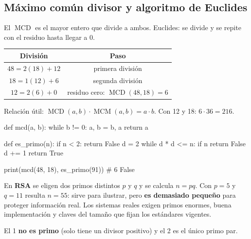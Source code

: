 \subsection{M\'aximo com\'un divisor y algoritmo de Euclides}
El $\operatorname{MCD}$ es el mayor entero que divide a ambos. Euclides: se divide y se repite con el residuo hasta llegar a 0.

\begin{center}
\begin{tabular}{|c|c|}
\hline
\rowcolor{tmAzulClaro}\textbf{Divisi\'on} & \textbf{Paso}\\ \hline
$48=2(18)+12$ & primera divisi\'on\\ \hline
$18=1(12)+6$ & segunda divisi\'on\\ \hline
$12=2(6)+0$ & residuo cero: $\operatorname{MCD}(48, 18)=6$\\ \hline
\end{tabular}
\end{center}

\begin{tmtip}Relaci\'on \'util: $\operatorname{MCD}(a, b)\cdot\operatorname{MCM}(a, b)=a\cdot b$. Con 12 y 18: $6\cdot36=216$.\end{tmtip}

\begin{tmcodigo}
def mcd(a, b):
    while b != 0:
        a, b = b, a %
    return a

def es_primo(n):
    if n < 2:
        return False
    d = 2
    while d * d <= n:
        if n %
            return False
        d += 1
    return True

print(mcd(48, 18), es_primo(91))   # 6 False
\end{tmcodigo}

\begin{tmsistemas}
En \textbf{RSA} se eligen dos primos distintos $p$ y $q$ y se calcula $n=pq$. Con $p=5$ y $q=11$ resulta $n=55$: sirve para ilustrar, pero \textbf{es demasiado peque\~no} para proteger informaci\'on real. Los sistemas reales exigen primos enormes, buena implementaci\'on y claves del tama\~no que fijan los est\'andares vigentes.
\end{tmsistemas}

\begin{tmcuidado}El 1 \textbf{no es primo} (solo tiene un divisor positivo) y el 2 es el \'unico primo par.\end{tmcuidado}

